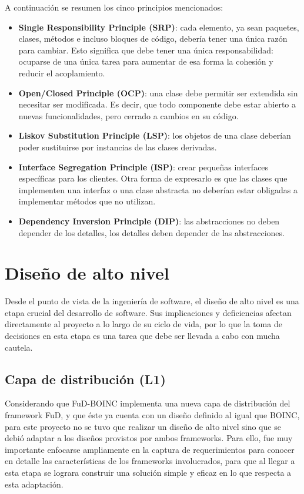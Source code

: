 A continuación se resumen los cinco principios mencionados:
\begin{itemize}
\item \textbf{Single Responsibility Principle (SRP)}: cada elemento, ya sean paquetes, clases, métodos e incluso bloques de código, debería tener una única razón para cambiar. Esto significa que debe tener una única responsabilidad: ocuparse de una única tarea para aumentar de esa forma la cohesión y reducir el acoplamiento.
\item \textbf{Open/Closed Principle (OCP)}: una clase debe permitir ser extendida sin necesitar ser modificada. Es decir, que todo componente debe estar abierto a nuevas funcionalidades, pero cerrado a cambios en su código. 
\item \textbf{Liskov Substitution Principle (LSP)}: los objetos de una clase deberían poder sustituirse por instancias de las clases derivadas. 
\item \textbf{Interface Segregation Principle (ISP)}: crear pequeñas interfaces específicas para los clientes. Otra forma de expresarlo es que las clases que implementen una interfaz o una clase abstracta no deberían estar obligadas a implementar métodos que no utilizan.
\item \textbf{Dependency Inversion Principle (DIP)}: las abstracciones no deben depender de los detalles, los detalles deben depender de las abstracciones.
\end{itemize}


\section{Diseño de alto nivel}

Desde el punto de vista de la ingeniería de software, el diseño de alto nivel es una etapa crucial del desarrollo de software. Sus implicaciones y deficiencias afectan directamente al proyecto a lo largo de su ciclo de vida, por lo que la toma de decisiones en esta etapa es una tarea que debe ser llevada a cabo con mucha cautela.

\subsection{Capa de distribución (L1)}

Considerando que FuD-BOINC implementa una nueva capa de distribución del framework FuD, y que éste ya cuenta con un diseño definido al igual que BOINC, para este proyecto no se tuvo que realizar un diseño de alto nivel sino que se debió adaptar a los diseños provistos por ambos frameworks. Para ello, fue muy importante enfocarse ampliamente en la captura de requerimientos para conocer en detalle las características de los frameworks involucrados, para que al llegar a esta etapa se lograra construir una solución simple y eficaz en lo que respecta a esta adaptación.

